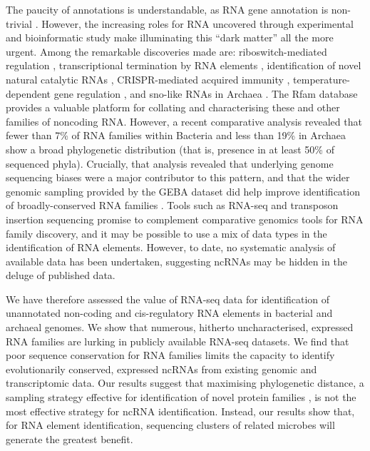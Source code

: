 \documentclass[10pt]{article}
\begin{document}
The paucity of annotations is understandable, as RNA gene annotation
is non-trivial \cite{Freyhult:2007,Nawrocki:2009}. However, the
increasing roles for RNA uncovered through experimental and
bioinformatic study make illuminating this ``dark matter'' all the more
urgent. Among the remarkable discoveries made are: riboswitch-mediated
regulation \cite{Barrick:2007,Breaker:2012}, transcriptional
termination by RNA elements
\cite{von_Hippel:1998,Gardner:2011,Santangelo:2011}, identification of
novel natural catalytic RNAs
\cite{Kruger:1982,Guerrier-Takada:1983,Winkler:2004,Roth:2014},
CRISPR-mediated acquired immunity \cite{Barrangou:2007,Brouns:2008},
temperature-dependent gene regulation \cite{Narberhaus:2006,Loh:2013},
and sno-like RNAs in Archaea
\cite{Omer:2000,Gaspin:2000,Gardner:2010}. The Rfam database
\cite{Gardner:2011,Burge:2013} provides a valuable platform for
collating and characterising these and other families of noncoding
RNA. However, a recent comparative analysis \cite{Hoeppner:2012}
revealed that fewer than 7\% of RNA families within Bacteria and less
than 19\% in Archaea show a broad phylogenetic distribution (that is,
presence in at least 50\% of sequenced phyla). Crucially, that
analysis revealed that underlying genome sequencing biases were a
major contributor to this pattern, and that the wider genomic sampling
provided by the GEBA dataset \cite{Wu:2009} did help improve
identification of broadly-conserved RNA families
\cite{Hoeppner:2012}. Tools such as RNA-seq \cite{Croucher:2010} and
transposon insertion sequencing
\cite{van_Opijnen:2013,Barquist:2013,Barquist:2013a} promise to
complement comparative genomics tools for RNA family discovery, and it
may be possible to use a mix of data types in the identification of
RNA elements. However, to date, no systematic analysis of available
data has been undertaken, suggesting ncRNAs may be hidden in the
deluge of published data.

We have therefore assessed the value of RNA-seq data for
identification of unannotated non-coding and cis-regulatory RNA
elements in bacterial and archaeal genomes. We show that numerous,
hitherto uncharacterised, expressed RNA families are lurking in
publicly available RNA-seq datasets. We find that poor sequence
conservation for RNA families limits the capacity to identify
evolutionarily conserved, expressed ncRNAs from existing genomic and
transcriptomic data. Our results suggest that maximising phylogenetic
distance, a sampling strategy effective for identification of novel
protein families \cite{Wu:2009,Rinke:2013}, is not the
most effective strategy for ncRNA identification. Instead, our results
show that, for RNA element identification, sequencing clusters of
related microbes will generate the greatest benefit.
\end{document}
